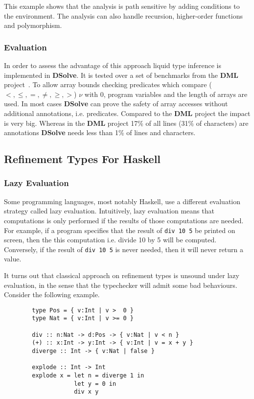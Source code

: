\documentclass[a4paper,UKenglish]{lipics-v2016}
\begin{document}
This example shows that the analysis is path sensitive by adding conditions to the environment.
The analysis can also handle recursion, higher-order functions and polymorphism.

\subsubsection{Evaluation}

In order to assess the advantage of this approach liquid type inference is implemented in \textbf{DSolve}.
It is tested over a set of benchmarks from the \textbf{DML} project~\cite{Xi:1998:EAB}.
To allow array bounds checking predicates which compare ($<, \le, =, \neq, \geq, >$) $\nu$ with 0, program variables and the length of arrays are used.
In most cases \textbf{DSolve} can prove the safety of array accesses without additional annotations, i.e. predicates.
Compared to the \textbf{DML} project the impact is very big.
Whereas in the \textbf{DML} project 17\% of all lines (31\% of characters) are annotations \textbf{DSolve} needs less than 1\% of lines and characters.


  \subsection{Refinement Types For Haskell}

    \subsubsection{Lazy Evaluation}

      Some programming languages, most notably Haskell, use a different
      evaluation strategy called lazy evaluation.  Intuitively, lazy evaluation
      means that computations is only performed if the results of those
      computations are needed.  For example, if a program specifies that the
      result of \texttt{div 10 5} be printed on screen, then the this
      computation i.e. divide 10 by 5 will be computed.  Conversely, if the
      result of \texttt{div 10 5} is never needed, then it will never return a
      value.  

      It turns out that classical approach on refinement types is unsound under
      lazy evaluation, in the sense that the typechecker will admit some bad
      behaviours.  Consider the following example.
      \begin{verbatim}
        type Pos = { v:Int | v >  0 }
        type Nat = { v:Int | v >= 0 }

        div :: n:Nat -> d:Pos -> { v:Nat | v < n } 
        (+) :: x:Int -> y:Int -> { v:Int | v = x + y }
        diverge :: Int -> { v:Nat | false } 

        explode :: Int -> Int
        explode x = let n = diverge 1 in 
                    let y = 0 in 
                    div x y
      \end{verbatim}
\end{document}
